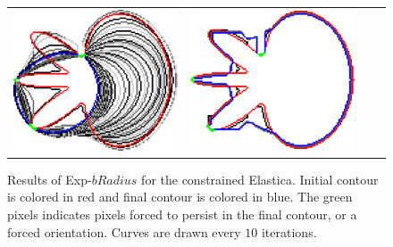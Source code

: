 \begin{figure}
\begin{tabular}{cccc}
\includegraphics[scale=0.2]{figures/chapter9/constrained-elastica/graphflow/flower-2/len_pen-0.0002/radius-7/N-1/h1.0/summary.pdf} &
\includegraphics[scale=0.2]{figures/chapter9/constrained-elastica/graphflow/flower-2/len_pen-0.0002/radius-50/N-1/h1.0/summary.pdf}\\


\end{tabular}
\caption{Results of Exp-$bRadius$ for the constrained Elastica. Initial contour is colored in red and final contour is colored in blue. The green pixels indicates pixels forced to persist in the final contour, or a forced orientation. Curves are drawn every $10$ iterations.}
\label{ch9:fig:results-constrained-elastica-radius}
\end{figure}



